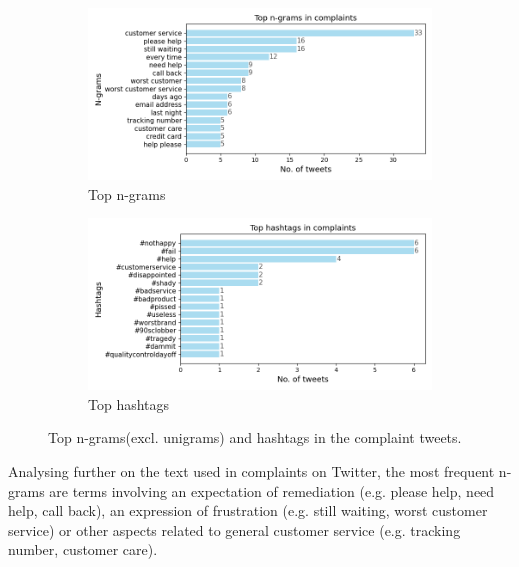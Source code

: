 \begin{figure}[htbp]
    \centering
    \captionsetup{font=small}
    \begin{subfigure}{0.49\textwidth}
        \centering
        \includegraphics[width=\linewidth]{figures/top_ngram_horiz_bar.png}
        \caption{Top n-grams}
        \label{fig: domain_dist_pct}
    \end{subfigure}
    \hfill
    \begin{subfigure}{0.49\textwidth}
        \centering
        \includegraphics[width=\linewidth]{figures/top_hash_horiz_bar.png}
        \caption{Top hashtags}
        \label{fig: domain_dist_count}
    \end{subfigure}
    \caption{Top n-grams(excl. unigrams) and hashtags in the complaint tweets.}
    \label{fig: compl_main_dist}
\end{figure}

Analysing further on the text used in complaints on Twitter, the most frequent n-grams are terms involving an expectation of remediation (e.g. please help, need help, call back), an expression of frustration (e.g. still waiting, worst customer service) or other aspects related to general customer service (e.g. tracking number, customer care). 

